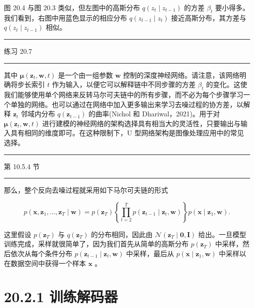 \documentclass[10pt]{report}
\newcommand{\HRule}{\begin{center}\rule{0.9\linewidth}{0.2mm}\end{center}}
\begin{document}
图 20.4 与图 20.3 类似，但左图中的高斯分布 \(q\left( {{z}_{t} \mid  {z}_{t - 1}}\right)\) 的方差 \({\beta }_{t}\) 要小得多。我们看到，右图中用蓝色显示的相应分布 \(q\left( {{z}_{t - 1} \mid  {z}_{t}}\right)\) 接近高斯分布，其方差与 \(q\left( {{z}_{t} \mid  {z}_{t - 1}}\right)\) 相似。

\HRule

练习 20.7

\HRule

其中 \(\mathbf{\mu }\left( {{\mathbf{z}}_{t},\mathbf{w},t}\right)\) 是一个由一组参数 \(\mathbf{w}\) 控制的深度神经网络。请注意，该网络明确将步长索引 \(t\) 作为输入，以便它可以解释链中不同步骤的方差 \({\beta }_{t}\) 的变化。这使我们能够使用单个网络来反转马尔可夫链中的所有步骤，而不必为每个步骤学习一个单独的网络。也可以通过在网络中加入更多输出来学习去噪过程的协方差，以解释 \({\mathbf{z}}_{t}\) 邻域内分布 \(q\left( {\mathbf{z}}_{t - 1}\right)\) 的曲率(Nichol 和 Dhariwal，2021)。用于对 \(\mathbf{\mu }\left( {{\mathbf{z}}_{t},\mathbf{w},t}\right)\) 进行建模的神经网络的架构选择具有相当大的灵活性，只要输出与输入具有相同的维度即可。在这种限制下，U 型网络架构是图像处理应用中的常见选择。

\HRule

第 10.5.4 节

\HRule

那么，整个反向去噪过程就采用如下马尔可夫链的形式

\[
p\left( {\mathbf{x},{\mathbf{z}}_{1},\ldots ,{\mathbf{z}}_{T} \mid  \mathbf{w}}\right)  = p\left( {\mathbf{z}}_{T}\right) \left\{  {\mathop{\prod }\limits_{{t = 2}}^{T}p\left( {{\mathbf{z}}_{t - 1} \mid  {\mathbf{z}}_{t},\mathbf{w}}\right) }\right\}  p\left( {\mathbf{x} \mid  {\mathbf{z}}_{1},\mathbf{w}}\right) . \tag{20.19}
\]

这里假设 \(p\left( {\mathbf{z}}_{T}\right)\) 与 \(q\left( {\mathbf{z}}_{T}\right)\) 的分布相同，因此由 \(\mathcal{N}\left( {{\mathbf{z}}_{T} \mid  \mathbf{0},\mathbf{I}}\right)\) 给出。一旦模型训练完成，采样就很简单了，因为我们首先从简单的高斯分布 \(p\left( {\mathbf{z}}_{T}\right)\) 中采样，然后依次从每个条件分布 \(p\left( {{\mathbf{z}}_{t - 1} \mid  {\mathbf{z}}_{t},\mathbf{w}}\right)\) 中采样，最后从 \(p\left( {\mathbf{x} \mid  {\mathbf{z}}_{1},\mathbf{w}}\right)\) 中采样以在数据空间中获得一个样本 \(\mathbf{x}\) 。

\section*{20.2.1 训练解码器}
\end{document}
